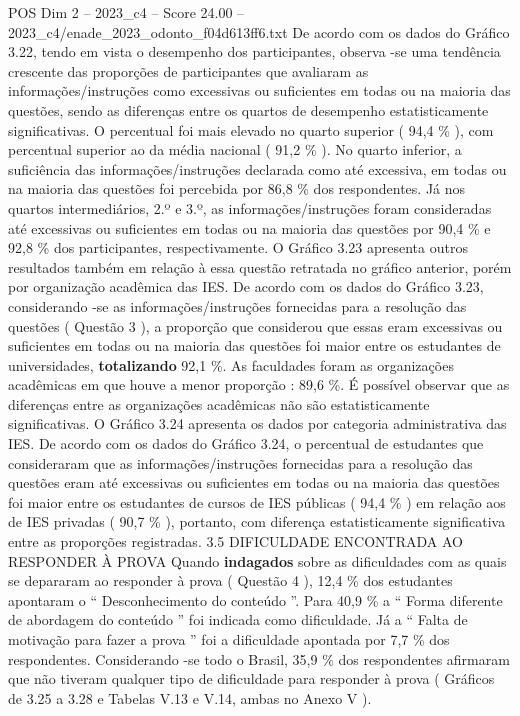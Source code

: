 \begin{textsample}{POS Dim 2 – 2023\_c4 – Score 24.00 – 2023\_c4/enade\_2023\_odonto\_f04d613ff6.txt}
De acordo com os dados do Gráfico 3.22, tendo em vista o desempenho dos participantes, observa -se uma tendência crescente das proporções de participantes que avaliaram as informações/instruções como excessivas ou suficientes em todas ou na maioria das questões, sendo as diferenças entre os quartos de desempenho estatisticamente significativas.
O percentual foi mais elevado no quarto superior ( 94,4 \% ), com percentual superior ao da média nacional ( 91,2 \% ).
No quarto inferior, a suficiência das informações/instruções declarada como até excessiva, em todas ou na maioria das questões foi percebida por 86,8 \% dos respondentes.
Já nos quartos intermediários, 2.º e 3.º, as informações/instruções foram consideradas até excessivas ou suficientes em todas ou na maioria das questões por 90,4 \% e 92,8 \% dos participantes, respectivamente.
O Gráfico 3.23 apresenta outros resultados também em relação à essa questão retratada no gráfico anterior, porém por organização acadêmica das IES.
De acordo com os dados do Gráfico 3.23, considerando -se as informações/instruções fornecidas para a resolução das questões ( Questão 3 ), a proporção que considerou que essas eram excessivas ou suficientes em todas ou na maioria das questões foi maior entre os estudantes de universidades, \textbf{totalizando} 92,1 \%.
As faculdades foram as organizações acadêmicas em que houve a menor proporção : 89,6 \%.
É possível observar que as diferenças entre as organizações acadêmicas não são estatisticamente significativas.
O Gráfico 3.24 apresenta os dados por categoria administrativa das IES.
De acordo com os dados do Gráfico 3.24, o percentual de estudantes que consideraram que as informações/instruções fornecidas para a resolução das questões eram até excessivas ou suficientes em todas ou na maioria das questões foi maior entre os estudantes de cursos de IES públicas ( 94,4 \% ) em relação aos de IES privadas ( 90,7 \% ), portanto, com diferença estatisticamente significativa entre as proporções registradas. 3.5 DIFICULDADE ENCONTRADA AO RESPONDER À PROVA Quando \textbf{indagados} sobre as dificuldades com as quais se depararam ao responder à prova ( Questão 4 ), 12,4 \% dos estudantes apontaram o “ Desconhecimento do conteúdo ”.
Para 40,9 \% a “ Forma diferente de abordagem do conteúdo ” foi indicada como dificuldade.
Já a “ Falta de motivação para fazer a prova ” foi a dificuldade apontada por 7,7 \% dos respondentes.
Considerando -se todo o Brasil, 35,9 \% dos respondentes afirmaram que não tiveram qualquer tipo de dificuldade para responder à prova ( Gráficos de 3.25 a 3.28 e Tabelas V.13 e V.14, ambas no Anexo V ).

\end{textsample}
